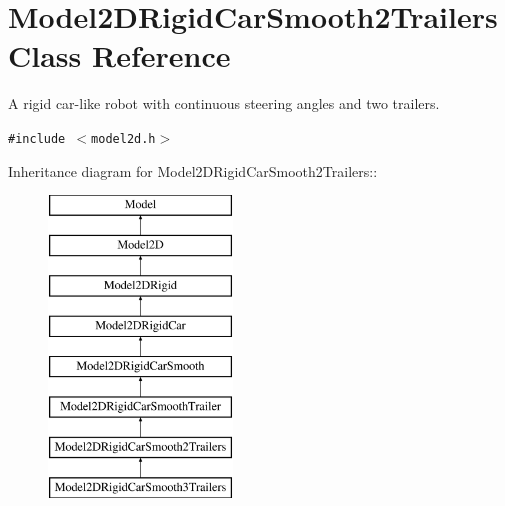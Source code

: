 \section{Model2DRigid\-Car\-Smooth2Trailers  Class Reference}
\label{classModel2DRigidCarSmooth2Trailers}
A rigid car-like robot with continuous steering angles and two trailers. 


{\tt \#include $<$model2d.h$>$}

Inheritance diagram for Model2DRigid\-Car\-Smooth2Trailers::\begin{figure}[H]
\begin{center}
\leavevmode
\includegraphics[height=8cm]{classModel2DRigidCarSmooth2Trailers}
\end{center}
\end{figure}
